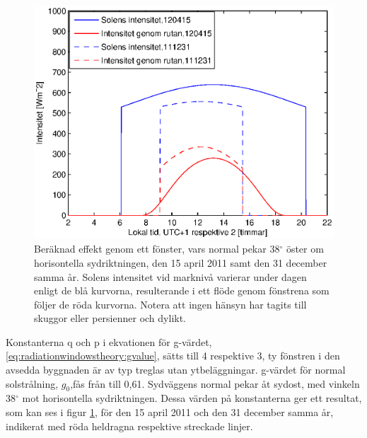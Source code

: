 \begin{figure}[hpbt]
\centering
\includegraphics[scale=0.7]{images/effekt0415and1231.eps}
\caption{\label{fig:effekt0415and1231} Beräknad effekt genom ett fönster, vars normal pekar 38$^{\circ}$ öster om horisontella sydriktningen, den 15 april 2011 samt den 31 december samma år. Solens intensitet vid marknivå varierar under dagen enligt de blå kurvorna, resulterande i ett flöde genom fönstrena som följer de röda kurvorna. Notera att ingen hänsyn har tagits till skuggor eller persienner och dylikt.}
\end{figure}

Konstanterna q och p i ekvationen för g-värdet, \ref{eq:radiationwindowstheory:gvalue}, sätts till 4 respektive 3, ty fönstren i den avsedda byggnaden är av typ treglas utan ytbeläggningar. g-värdet för normal solstrålning, $g_0$,fås från \cite{ASHRAE09} till 0,61. Sydväggens normal pekar åt sydost, med vinkeln 38$^{\circ}$ mot horisontella sydriktningen. Dessa värden på konstanterna ger ett resultat, som kan ses i figur \ref{fig:effekt0415and1231}, för den 15 april 2011 och den 31 december samma år, indikerat med röda heldragna respektive streckade linjer.
